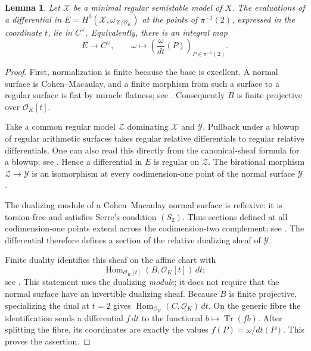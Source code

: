 \documentclass[11pt,a4paper]{article}
\newtheorem{lemma}[theorem]{Lemma}
\theoremstyle{definition}
\newcommand{\OK}{\mathcal O_K}
\begin{document}
\begin{lemma}\label{lem:integral-evaluation}
Let $\mathcal X$ be a minimal regular semistable model of $X$.
The evaluations of a differential in
$E=H^0(\mathcal X,\omega_{\mathcal X/\OK})$ at the points of
$\pi^{-1}(2)$, expressed in the coordinate $t$, lie in $C^\vee$.
Equivalently, there is an integral map
\[
 E\longrightarrow C^\vee,
 \qquad \omega\longmapsto
       \left(\frac{\omega}{dt}(P)\right)_{P\in\pi^{-1}(2)}.
\]
\end{lemma}
\begin{proof}
First, normalization is finite because the base is excellent.
A normal surface is Cohen--Macaulay, and a finite morphism from
such a surface to a regular surface is flat by miracle flatness;
see \cite[Tag~00R4]{Stacks}. Consequently $B$ is finite projective
over $\OK[t]$.

Take a common regular model $\mathcal Z$ dominating
$\mathcal X$ and $\mathcal Y$. Pullback under a blowup of regular
arithmetic surfaces takes regular relative differentials to regular
relative differentials. One can also read this directly from the
canonical-sheaf formula for a blowup; see
\cite[Lemma~2.3.1]{Javanpeykar}.
Hence a differential in $E$ is regular on $\mathcal Z$.
The birational morphism $\mathcal Z\to\mathcal Y$ is an
isomorphism at every codimension-one point of the normal surface
$\mathcal Y$.

The dualizing module of a Cohen--Macaulay normal surface is
reflexive: it is torsion-free and satisfies Serre's condition
$(S_2)$. Thus sections defined at all codimension-one points extend
across the codimension-two complement; see
\cite[Tags~0AWQ and~0AVT, Lemmas~31.13.12--31.13.14]{Stacks}.
The differential therefore defines a section of the relative
dualizing sheaf of $\mathcal Y$.

Finite duality identifies this sheaf on the affine chart with
\[
 \operatorname{Hom}_{\OK[t]}(B,\OK[t])\,dt;
\]
see \cite[Tags~0BUL and~0C0I]{Stacks}.
This statement uses the dualizing \emph{module}; it does not require
that the normal surface have an invertible dualizing sheaf.
Because $B$ is finite projective, specializing the dual at $t=2$
gives $\operatorname{Hom}_{\OK}(C,\OK)\,dt$.
On the generic fibre the identification sends a differential
$f\,dt$ to the functional $b\mapsto\operatorname{Tr}(fb)$.
After splitting the fibre, its coordinates are exactly the values
$f(P)=\omega/dt(P)$. This proves the assertion.
\end{proof}
\end{document}
